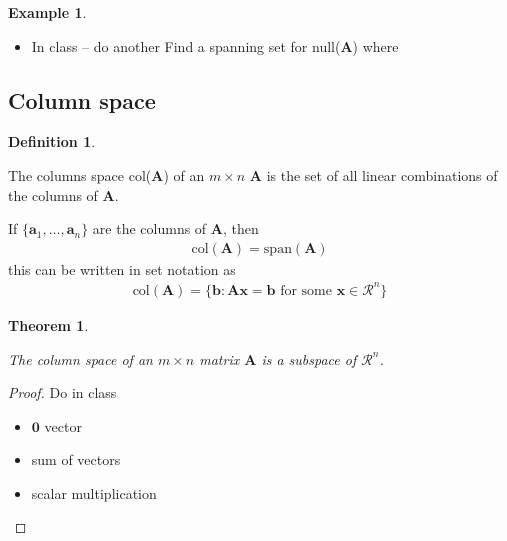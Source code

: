 \documentclass[
]{book}
\providecommand{\tightlist}{%
  \setlength{\itemsep}{0pt}\setlength{\parskip}{0pt}}
\newtheorem{theorem}{Theorem}[chapter]
\theoremstyle{definition}
\newtheorem{definition}{Definition}[chapter]
\theoremstyle{definition}
\newtheorem{example}{Example}[chapter]
\theoremstyle{definition}
\theoremstyle{remark}
\begin{document}
\begin{example}
\protect\hypertarget{exm:unlabeled-div-121}{}\label{exm:unlabeled-div-121}

\begin{itemize}
\tightlist
\item
  In class -- do another
  Find a spanning set for null(\(\mathbf{A}\)) where
\end{itemize}

\end{example}

\hypertarget{column-space}{%
\subsection{Column space}\label{column-space}}

\begin{definition}
\protect\hypertarget{def:unlabeled-div-122}{}\label{def:unlabeled-div-122}

The columns space col(\(\mathbf{A}\)) of an \(m \times n\) \(\mathbf{A}\) is the set of all linear combinations of the columns of \(\mathbf{A}\).

If \(\{ \mathbf{a}_1, \ldots, \mathbf{a}_n\}\) are the columns of \(\mathbf{A}\), then
\[
\begin{aligned}
\mbox{col}(\mathbf{A}) = \mbox{span}(\mathbf{A})
\end{aligned}
\]
this can be written in set notation as
\[
\begin{aligned}
\mbox{col}(\mathbf{A}) = \{ \mathbf{b} : \mathbf{A} \mathbf{x} = \mathbf{b} \mbox{ for some } \mathbf{x} \in \mathcal{R}^n \}
\end{aligned}
\]

\end{definition}

\begin{theorem}
\protect\hypertarget{thm:unlabeled-div-123}{}\label{thm:unlabeled-div-123}

The column space of an \(m \times n\) matrix \(\mathbf{A}\) is a subspace of \(\mathcal{R}^n\).

\end{theorem}

\begin{proof}

Do in class

\begin{itemize}
\item
  \(\mathbf{0}\) vector
\item
  sum of vectors
\item
  scalar multiplication
\end{itemize}

\end{proof}
\end{document}
